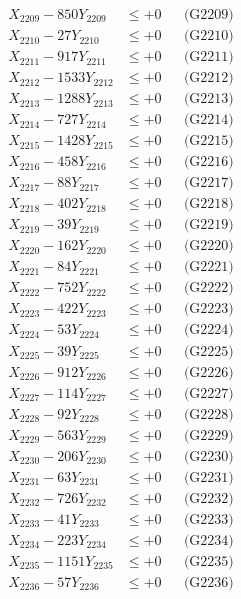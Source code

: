 \documentclass[a4paper,10pt]{article}
\begin{document}
{\begin{align}
X_{2209} - 850Y_{2209} &\leq +0 && \text{(G2209)} \\
X_{2210} - 27Y_{2210} &\leq +0 && \text{(G2210)} \\
\allowbreak
X_{2211} - 917Y_{2211} &\leq +0 && \text{(G2211)} \\
X_{2212} - 1533Y_{2212} &\leq +0 && \text{(G2212)} \\
X_{2213} - 1288Y_{2213} &\leq +0 && \text{(G2213)} \\
X_{2214} - 727Y_{2214} &\leq +0 && \text{(G2214)} \\
X_{2215} - 1428Y_{2215} &\leq +0 && \text{(G2215)} \\
X_{2216} - 458Y_{2216} &\leq +0 && \text{(G2216)} \\
X_{2217} - 88Y_{2217} &\leq +0 && \text{(G2217)} \\
X_{2218} - 402Y_{2218} &\leq +0 && \text{(G2218)} \\
X_{2219} - 39Y_{2219} &\leq +0 && \text{(G2219)} \\
X_{2220} - 162Y_{2220} &\leq +0 && \text{(G2220)} \\
\allowbreak
X_{2221} - 84Y_{2221} &\leq +0 && \text{(G2221)} \\
X_{2222} - 752Y_{2222} &\leq +0 && \text{(G2222)} \\
X_{2223} - 422Y_{2223} &\leq +0 && \text{(G2223)} \\
X_{2224} - 53Y_{2224} &\leq +0 && \text{(G2224)} \\
X_{2225} - 39Y_{2225} &\leq +0 && \text{(G2225)} \\
X_{2226} - 912Y_{2226} &\leq +0 && \text{(G2226)} \\
X_{2227} - 114Y_{2227} &\leq +0 && \text{(G2227)} \\
X_{2228} - 92Y_{2228} &\leq +0 && \text{(G2228)} \\
X_{2229} - 563Y_{2229} &\leq +0 && \text{(G2229)} \\
X_{2230} - 206Y_{2230} &\leq +0 && \text{(G2230)} \\
\allowbreak
X_{2231} - 63Y_{2231} &\leq +0 && \text{(G2231)} \\
X_{2232} - 726Y_{2232} &\leq +0 && \text{(G2232)} \\
X_{2233} - 41Y_{2233} &\leq +0 && \text{(G2233)} \\
X_{2234} - 223Y_{2234} &\leq +0 && \text{(G2234)} \\
X_{2235} - 1151Y_{2235} &\leq +0 && \text{(G2235)} \\
X_{2236} - 57Y_{2236} &\leq +0 && \text{(G2236)} \\

\end{align}}
\end{document}
